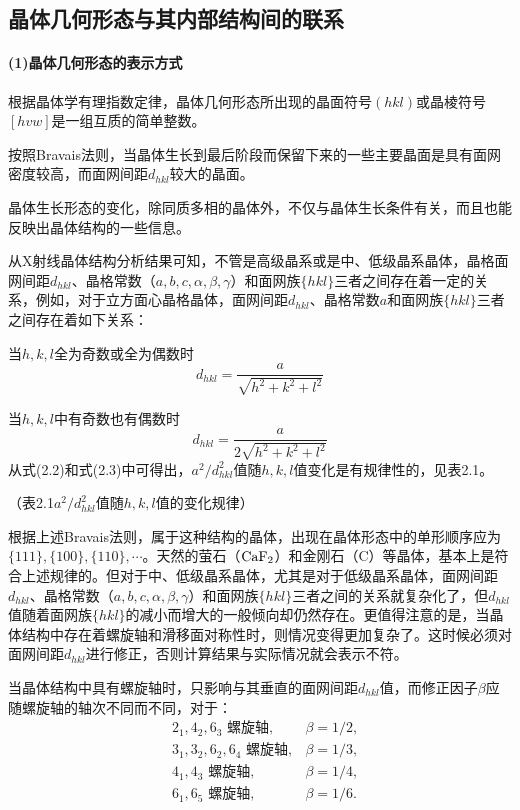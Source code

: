 \subsection{晶体几何形态与其内部结构间的联系}
\paragraph{(1)晶体几何形态的表示方式}根据晶体学有理指数定律，晶体几何形态所出现的晶面符号$(hkl)$或晶棱符号$[hvw]$是一组互质的简单整数。

按照Bravais法则，当晶体生长到最后阶段而保留下来的一些主要晶面是具有面网密度较高，而面网间距$d_{hkl}$较大的晶面。

晶体生长形态的变化，除同质多相的晶体外，不仅与晶体生长条件有关，而且也能反映出晶体结构的一些信息。

从X射线晶体结构分析结果可知，不管是高级晶系或是中、低级晶系晶体，晶格面网间距$d_{hkl}$、晶格常数（$a,b,c,\alpha,\beta,\gamma$）和面网族$\{hkl\}$三者之间存在着一定的关系，例如，对于立方面心晶格晶体，面网间距$d_{hkl}$、晶格常数$a$和面网族$\{hkl\}$三者之间存在着如下关系：

当$h,k,l$全为奇数或全为偶数时
\begin{equation}
d_{hkl}=\frac{a}{\sqrt{h^2+k^2+l^2}}
\end{equation}

当$h,k,l$中有奇数也有偶数时
\begin{equation}
d_{hkl}=\frac{a}{2\sqrt{h^2+k^2+l^2}}
\end{equation}
从式(2.2)和式(2.3)中可得出，$a^2/d^2_{hkl}$值随$h,k,l$值变化是有规律性的，见表2.1。

（表2.1\quad$a^2/d^2_{hkl}$值随$h,k,l$值的变化规律）

根据上述Bravais法则，属于这种结构的晶体，出现在晶体形态中的单形顺序应为$\{111\},\{100\},\{110\},\cdots$。天然的萤石（$\rm CaF_2$）和金刚石（C）等晶体，基本上是符合上述规律的。但对于中、低级晶系晶体，尤其是对于低级晶系晶体，面网间距$d_{hkl}$、晶格常数（$a,b,c,\alpha,\beta,\gamma$）和面网族$\{hkl\}$三者之间的关系就复杂化了，但$d_{hkl}$值随着面网族$\{hkl\}$的减小而增大的一般倾向却仍然存在。更值得注意的是，当晶体结构中存在着螺旋轴和滑移面对称性时，则情况变得更加复杂了。这时候必须对面网间距$d_{hkl}$进行修正，否则计算结果与实际情况就会表示不符。

当晶体结构中具有螺旋轴时，只影响与其垂直的面网间距$d_{hkl}$值，而修正因子$\beta$应随螺旋轴的轴次不同而不同，对于：
\begin{align*}
&2_1,4_2,6_3\text{ 螺旋轴}, &\beta = 1/2, \\
&3_1,3_2,6_2,6_4\text{ 螺旋轴}, &\beta = 1/3,\\
&4_1,4_3\text{ 螺旋轴}, &\beta = 1/4,\\
&6_1,6_5\text{ 螺旋轴}, &\beta = 1/6.
\end{align*}

